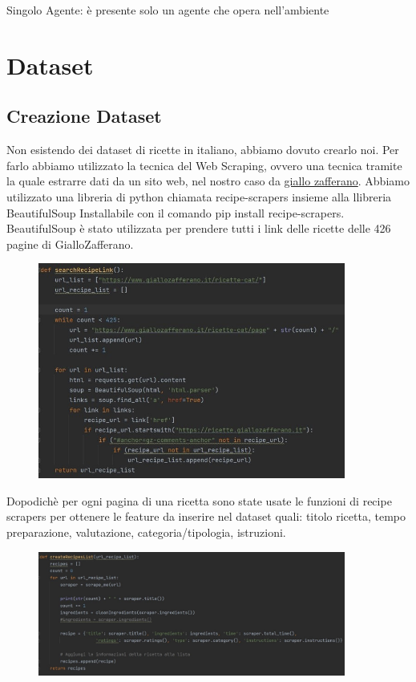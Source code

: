 \documentclass[12pt]{report}
\begin{document}
Singolo Agente: è presente solo un agente che opera nell’ambiente

\chapter{Dataset}
\section{Creazione Dataset}
Non esistendo dei dataset di ricette in italiano, abbiamo dovuto crearlo noi. Per farlo abbiamo utilizzato la tecnica del Web Scraping, ovvero una tecnica tramite la quale estrarre dati da un sito web, nel nostro caso da \href{https://www.giallozafferano.it/}{giallo zafferano}. 
Abbiamo utilizzato una libreria di python chiamata recipe-scrapers insieme alla llibreria BeautifulSoup
Installabile con il comando pip install recipe-scrapers.   
BeautifulSoup è stato utilizzata per prendere tutti i link delle ricette delle 426 pagine di GialloZafferano.
    \begin{figure}[H]
        \centering
        {\includegraphics[width=0.9\textwidth]{img/img1.jpg}}
    \end{figure}
Dopodichè  per ogni pagina di una ricetta sono state usate le funzioni di recipe scrapers per ottenere le feature da inserire nel dataset quali: titolo ricetta, tempo preparazione, valutazione, categoria/tipologia, istruzioni.
    \begin{figure}[H]
        \centering
        {\includegraphics[width=0.9\textwidth]{img/img2.jpg}}
    \end{figure}
\end{document}
